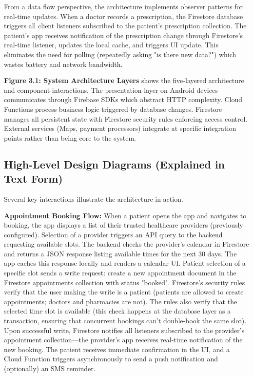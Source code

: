 \documentclass[12pt,a4paper]{report}
\begin{document}
From a data flow perspective, the architecture implements observer patterns for real-time updates. When a doctor records a prescription, the Firestore database triggers all client listeners subscribed to the patient's prescription collection. The patient's app receives notification of the prescription change through Firestore's real-time listener, updates the local cache, and triggers UI update. This eliminates the need for polling (repeatedly asking "is there new data?") which wastes battery and network bandwidth.

\textbf{Figure 3.1: System Architecture Layers} shows the five-layered architecture and component interactions. The presentation layer on Android devices communicates through Firebase SDKs which abstract HTTP complexity. Cloud Functions process business logic triggered by database changes. Firestore manages all persistent state with Firestore security rules enforcing access control. External services (Maps, payment processors) integrate at specific integration points rather than being core to the system.

\subsection{High-Level Design Diagrams (Explained in Text Form)}

Several key interactions illustrate the architecture in action.

\textbf{Appointment Booking Flow:} When a patient opens the app and navigates to booking, the app displays a list of their trusted healthcare providers (previously configured). Selection of a provider triggers an API query to the backend requesting available slots. The backend checks the provider's calendar in Firestore and returns a JSON response listing available times for the next 30 days. The app caches this response locally and renders a calendar UI. Patient selection of a specific slot sends a write request: create a new appointment document in the Firestore appointments collection with status "booked". Firestore's security rules verify that the user making the write is a patient (patients are allowed to create appointments; doctors and pharmacies are not). The rules also verify that the selected time slot is available (this check happens at the database layer as a transaction, ensuring that concurrent bookings can't double-book the same slot). Upon successful write, Firestore notifies all listeners subscribed to the provider's appointment collection—the provider's app receives real-time notification of the new booking. The patient receives immediate confirmation in the UI, and a Cloud Function triggers asynchronously to send a push notification and (optionally) an SMS reminder.
\end{document}
